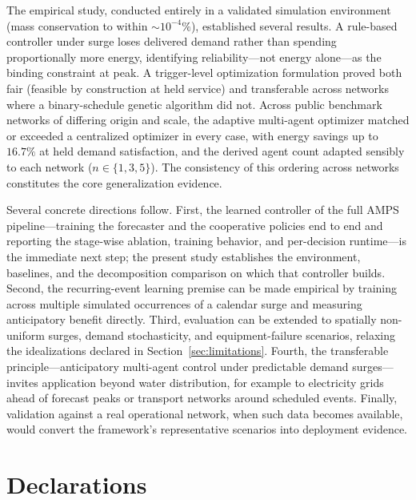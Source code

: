 \documentclass[11pt,a4paper]{article}
\begin{document}
The empirical study, conducted entirely in a validated simulation environment
(mass conservation to within ${\sim}10^{-4}\%$), established several results. A
rule-based controller under surge loses delivered demand rather than spending
proportionally more energy, identifying reliability---not energy alone---as the
binding constraint at peak. A trigger-level optimization formulation proved both
fair (feasible by construction at held service) and transferable across networks
where a binary-schedule genetic algorithm did not. Across public benchmark
networks of differing origin and scale, the adaptive multi-agent optimizer
matched or exceeded a centralized optimizer in every case, with energy savings up
to $16.7\%$ at held demand satisfaction, and the derived agent count adapted
sensibly to each network ($n \in \{1,3,5\}$). The consistency of this ordering
across networks constitutes the core generalization evidence.

Several concrete directions follow. First, the learned controller of the full
AMPS pipeline---training the forecaster and the cooperative policies end to end
and reporting the stage-wise ablation, training behavior, and per-decision
runtime---is the immediate next step; the present study establishes the
environment, baselines, and the decomposition comparison on which that
controller builds. Second, the recurring-event learning premise can be made
empirical by training across multiple simulated occurrences of a calendar surge
and measuring anticipatory benefit directly. Third, evaluation can be extended to
spatially non-uniform surges, demand stochasticity, and equipment-failure
scenarios, relaxing the idealizations declared in Section~\ref{sec:limitations}.
Fourth, the transferable principle---anticipatory multi-agent control under
predictable demand surges---invites application beyond water distribution, for
example to electricity grids ahead of forecast peaks or transport networks around
scheduled events. Finally, validation against a real operational network, when
such data becomes available, would convert the framework's representative
scenarios into deployment evidence.

\section*{Declarations}
\end{document}
